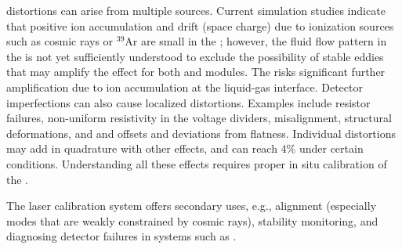 \efield distortions can arise from multiple sources. Current simulation studies indicate that positive ion accumulation and drift (space charge) due to ionization sources such as cosmic rays or ${}^{39}$Ar are small in the ; however, the fluid flow pattern in the  is not yet sufficiently understood to exclude the possibility of stable eddies that may amplify the effect for both \single and \dual modules. The  risks significant further amplification due to ion accumulation at the liquid-gas interface. 
Detector imperfections can also cause localized \efield distortions. Examples include  resistor failures, non-uniform resistivity in the voltage dividers,  misalignment,  structural deformations, and  and  offsets and  deviations from flatness. Individual \efield distortions may add in quadrature with other effects, and can reach 4\% under certain conditions. Understanding all these effects requires proper in situ calibration of the \efield{}. 

The laser calibration system offers secondary uses, e.g., alignment (especially modes that are weakly constrained by cosmic rays), stability monitoring, and diagnosing detector failures in systems such as .  

